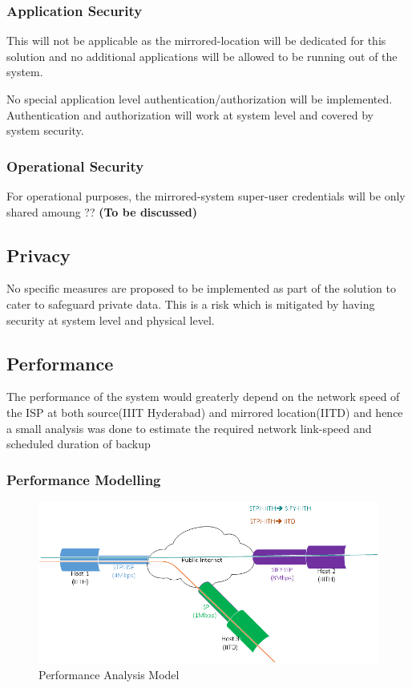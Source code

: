 \documentclass[11pt]{article}
\begin{document}
\subsubsection{Application Security}
\label{sec-8.6.3}

 This will not be applicable as the mirrored-location will be
dedicated for this solution and no additional applications will be
allowed to be running out of the system.
 
No special application level authentication/authorization will be
   implemented. Authentication and authorization will work at system
   level and covered by system security.
\subsubsection{Operational Security}
\label{sec-8.6.4}

 For operational purposes, the mirrored-system super-user credentials
 will be only shared amoung ?? \textbf{(To be discussed)}
\subsection{Privacy}
\label{sec-8.7}

   No specific measures are proposed to be implemented as part of the
   solution to cater to safeguard private data. This is a risk which
   is mitigated by having security at system level and physical level.
\subsection{Performance}
\label{sec-8.8}

   The performance of the system would greaterly depend on the
     network speed of the ISP at both source(IIIT Hyderabad) and
     mirrored location(IITD) and hence a small analysis was done to
     estimate the required network link-speed and scheduled duration
     of backup
\subsubsection{Performance Modelling}
\label{sec-8.8.1}


  \begin{figure}[H]
\centering
\includegraphics[width=16cm]{Performance Analysis Model.png}
\caption{Performance Analysis Model}
\end{figure}
\end{document}
